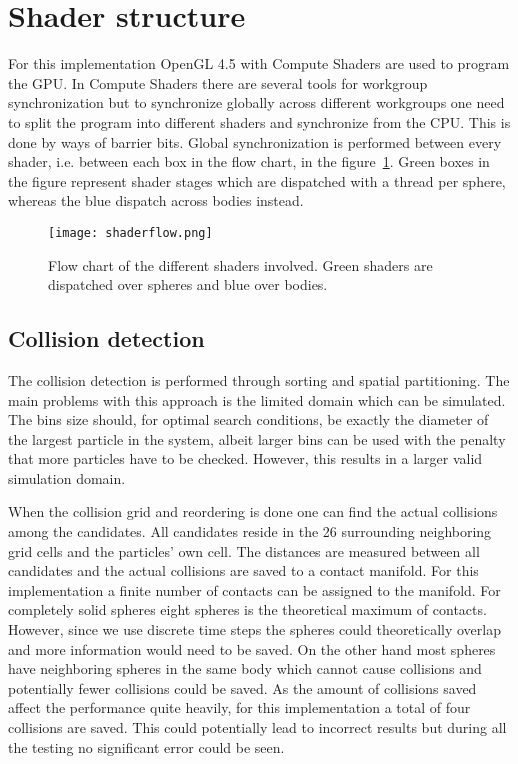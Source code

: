 \section{Shader structure}
For this implementation OpenGL 4.5 with Compute Shaders are used to program the GPU.
 In Compute Shaders there are several tools for workgroup synchronization
but to synchronize globally across different workgroups one need to split the program into
different shaders and synchronize from the CPU. This is done by ways of barrier bits. Global synchronization
is performed between every shader, i.e. between each box in the flow chart, in the figure~\ref{fig:flow}. Green
boxes in the figure represent shader stages which are dispatched with a thread per
sphere, whereas the blue dispatch across bodies instead.

\begin{figure}[H]
  \centering
  \texttt{[image: shaderflow.png]}
  \caption{Flow chart of the different shaders involved. Green shaders are dispatched over spheres and blue over bodies.}
  \label{fig:flow}
\end{figure}

\subsection{Collision detection}
The collision detection is performed through sorting and spatial partitioning.
The main problems with this approach is the limited domain which can be simulated.
The bins size should, for optimal search conditions, be exactly the diameter of the largest
particle in the system, albeit larger bins can be used with the penalty that more
particles have to be checked. However, this results in a larger valid simulation domain.

When the collision grid and reordering is done one can find the actual collisions
among the candidates. All candidates reside in the 26 surrounding neighboring
grid cells and the particles' own cell. The distances are measured between all
candidates and the actual collisions are saved to a contact manifold.
For this implementation a finite number of
contacts can be assigned to the manifold. For completely solid spheres eight spheres
is the theoretical maximum of contacts. However, since we use discrete time steps
the spheres could theoretically overlap and more information would need to be saved.
On the other hand most spheres have neighboring spheres in the same body which cannot
cause collisions and potentially fewer collisions could be saved. As the amount of
collisions saved affect the performance quite heavily, for this implementation a total
of four collisions are saved. This could potentially lead to incorrect results but
during all the testing no significant error could be seen.

